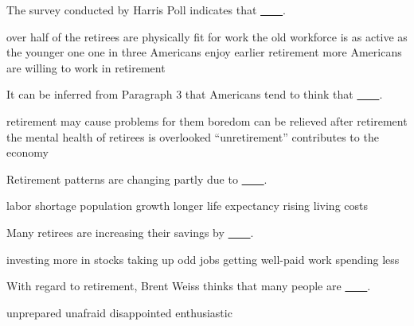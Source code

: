 \item The survey conducted by Harris Poll indicates that \uline{~~~~}.
\begin{tasks}
	\task over half of the retirees are physically fit for work
	\task the old workforce is as active as the younger one
	\task one in three Americans enjoy earlier retirement
	\task more Americans are willing to work in retirement
\end{tasks}
\item It can be inferred from Paragraph 3 that Americans tend to think that \uline{~~~~}.
\begin{tasks}
	\task retirement may cause problems for them
	\task boredom can be relieved after retirement
	\task the mental health of retirees is overlooked
	\task ``unretirement'' contributes to the economy
\end{tasks}
\item Retirement patterns are changing partly due to \uline{~~~~}.
\begin{tasks}
	\task labor shortage
	\task population growth
	\task longer life expectancy
	\task rising living costs
\end{tasks}
\item Many retirees are increasing their savings by \uline{~~~~}.
\begin{tasks}
	\task investing more in stocks
	\task taking up odd jobs
	\task getting well-paid work
	\task spending less
\end{tasks}
\item With regard to retirement, Brent Weiss thinks that many people are \uline{~~~~}.
\begin{tasks}
	\task unprepared
	\task unafraid
	\task disappointed
	\task enthusiastic
\end{tasks}
